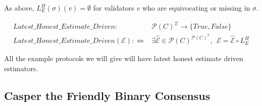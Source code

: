 As above, $L^H_E(\sigma)(v) = \emptyset$ for validators $v$ who are equivocating or missing in $\sigma$.

\begin{defn}
\begin{align*}
Latest\_Honest\_Estimate\_Driven:& \mathcal{P}(C)^\Sigma \to \{True, False\} \\
Latest\_Honest\_Estimate\_Driven(\mathcal{E}) :\Leftrightarrow& \exists \hat{\mathcal{E}} \in \mathcal{P}(C)^{\mathcal{P}(C)^\mathcal{V}}, ~~\mathcal{E} = \hat{\mathcal{E}} \circ L^H_E
\end{align*}
\end{defn}

All the example protocols we will give will have latest honest estimate driven estimators.

\iffalse
We define ``!", an operator used to return the single element of a singleton set:
\begin{defn}
$$
!: \mathcal{P}(X) \to X
$$
$$
!(A) = a \in A : \forall b \in A, b = a
$$
\end{defn}

Note that it is not defined when its argument is not singleton (i.e. when it is a multi-element or empty set).

\begin{defn}[Properties of Consensus Values]
\begin{align*}
P_{\mathcal{C}} = \{True, False\}^{\mathcal{C}}
\end{align*}
\end{defn}
\fi



\subsection{Casper the Friendly Binary Consensus}

